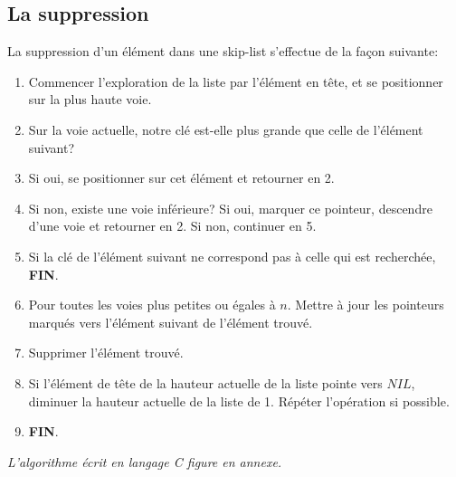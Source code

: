 \documentclass[hidelinks,a4paper, 12pt]{article}
\begin{document}
	\newpage
	\subsection{La suppression}
	La suppression d'un élément dans une skip-list s'effectue de la façon suivante:
	\begin{enumerate}
		\item Commencer l'exploration de la liste par l'élément en tête, et se positionner sur la plus haute voie.
		\item Sur la voie actuelle, notre clé est-elle plus grande que celle de l'élément suivant?
		\item Si oui, se positionner sur cet élément et retourner en 2.
		\item Si non, existe une voie inférieure? 
		\subitem Si oui, marquer ce pointeur, descendre d'une voie et retourner en 2.
		\subitem Si non, continuer en 5.
		\subitem 
		\item Si la clé de l'élément suivant ne correspond pas à celle qui est recherchée, \textbf{FIN}.
		\item Pour toutes les voies plus petites ou égales à $n$.
		\subitem  Mettre à jour les pointeurs marqués vers l'élément suivant de l'élément trouvé.	
		\item Supprimer l'élément trouvé.
		\item Si l'élément de tête de la hauteur actuelle de la liste pointe vers $NIL$, diminuer la hauteur actuelle de la liste de 1. Répéter l'opération si possible.
		\item \textbf{FIN}.
	\end{enumerate}
	\emph{L'algorithme écrit en langage C figure en annexe.}
	
	\newpage
\end{document}
